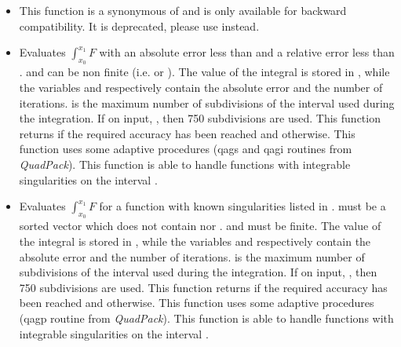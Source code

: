 \begin{itemize}
\item {}
  \sshortdescribe This function is a synonymous of
   and is only available for backward
  compatibility. It is deprecated, please use 
  instead. 

\item {}
  \sshortdescribe Evaluates $\int_{x_0}^{x_1} F$ with an absolute error less
  than  and a relative error less than .  and
   can be non finite (i.e.  or ). The
  value of the integral is stored in , while the variables
   and  respectively contain the absolute error and the
  number of iterations.  is the maximum number of subdivisions of the
  interval  used during the integration. If on input, , then 750 subdivisions are used.  This function returns  if the
  required accuracy has been reached and  otherwise. This function
  uses some adaptive procedures (qags and qagi routines from {\it QuadPack}).
  This function is able to handle functions  with integrable
  singularities on the interval \var{[x0,x1]}.

\item {}
  \sshortdescribe Evaluates $\int_{x_0}^{x_1} F$  for a function
   with known singularities listed in .
   must be a sorted vector which does not contain 
  nor .   and  must be  finite. The value of the
  integral is stored in , while the variables  and
   respectively contain the absolute error and the number of
  iterations.  is the maximum number of subdivisions of the interval
   used during the integration. If on input, , then
  750 subdivisions are used.  This function returns  if the required
  accuracy has been reached and  otherwise. This function uses some
  adaptive procedures (qagp routine from {\it QuadPack}).  This function is
  able to handle functions  with integrable singularities on the interval
  \var{[x0,x1]}.
\end{itemize}


